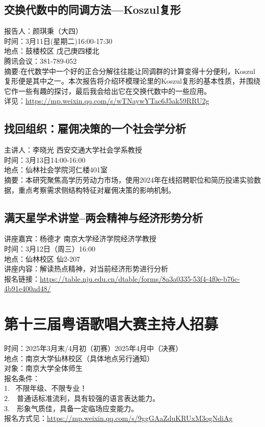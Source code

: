 \documentclass[letterpaper, 12pt]{article}
\begin{document}
\begin{multicols}{2}
\subsection{交换代数中的同调方法—Koszul复形}
报告人：颜琪秉（大四）\\
时间：3月11日(星期二)16:00-17:30\\
地点：鼓楼校区 戊己庚四楼北\\
腾讯会议：381-789-052\\
摘要:在代数学中一个好的正合分解往往能让同调群的计算变得十分便利，Koszul复形便是其中之一。本次报告将介绍环模理论里的Koszul复形的基本性质，并围绕它作一些有趣的探讨，最后我会给出它在交换代数中的一些应用。\\
详见：\url{https://mp.weixin.qq.com/s/wTNaywYTac6J5ak59RRU2g}
\subsection{找回组织：雇佣决策的一个社会学分析}
主讲人：李晓光 西安交通大学社会学系教授\\
时间：3月13日14:00-16:00\\
地点：仙林社会学院河仁楼401室\\
摘要：本研究聚焦高学历劳动力市场，使用2024年在线招聘职位和简历投递实验数据，重点考察需求侧结构特征对雇佣决策的影响机制。\\
\subsection{满天星学术讲堂--两会精神与经济形势分析}
讲座嘉宾：杨德才 南京大学经济学院经济学教授\\
时间：3月12日（周三）16:00\\
地点：仙林校区 仙2-207\\
讲座内容：解读热点精神，对当前经济形势进行分析\\
报名链接：\url{https://table.nju.edu.cn/dtable/forms/8a3a0335-53f4-4f0e-b76c-4b91e400ad48/}\\
\section{第十三届粤语歌唱大赛主持人招募}
时间：2025年3月末/4月初（初赛）2025年4月中（决赛）\\
地点：南京大学仙林校区（具体地点另行通知）\\
对象：南京大学全体师生\\
报名条件：\\
1.  不限年级、不限专业！\\
2.  普通话标准流利，具有较强的语言表达能力。\\
3.  形象气质佳，具备一定临场应变能力。\\
报名方式见：\url{https://mp.weixin.qq.com/s/9ggGAaZduKRUxM3ogNdiAg}

\end{multicols}
\end{document}
